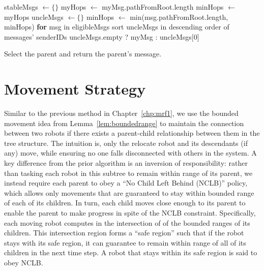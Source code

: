 \begin{algorithm}
{}
  stableMsgs $\leftarrow \{\}$\;
  myHops $\leftarrow$ myMsg.pathFromRoot.length\;
  minHops $\leftarrow$ myHops\;
  uncleMsgs $\leftarrow \{\}$\;
  minHops $\leftarrow$ min(msg.pathFromRoot.length, minHops) \textbf{for} msg in eligibleMsgs\;
  sort uncleMsgs in descending order of messages' senderIDs
  \Return uncleMsgs.empty ? myMsg : uncleMsgs[0]\;
  \caption{Select the parent and return the parent's message.}
  \label{alg:parent}
\end{algorithm}

\begin{figure}
   \centering
   
   \label{fig:spanningtree}
\end{figure}

\section{Movement Strategy}
\label{sec:mov}

Similar to the previous method in Chapter~\ref{chp:mrf1}, we use the bounded movement idea from Lemma~\ref{lem:boundedrange} to maintain
the connection between two robots if there exists a parent-child relationship
between them in the tree structure.  
%
The intuition is, only the relocate robot and its descendants (if any) move, while ensuring no one falls disconnected with others in the system.
%
A key difference from the prior algorithm is an inversion of responsibility:
rather than tasking each robot in this subtree to remain within range of its
parent, we instead require each parent to obey a ``No Child Left Behind
(NCLB)'' policy, which allows only movements that are guaranteed to stay within
bounded range of each of its children.
%
In turn, each child moves close enough to its parent to enable the parent to
make progress in spite of the NCLB constraint.
%
Specifically, each moving robot computes in the intersection of of the bounded
ranges of its children.  
%
This intersection region forms a ``safe region'' such
that if the robot stays with its safe region, it can guarantee to remain within
range of all of its children in the next time step.  
%
A robot that stays within
its safe region is said to obey NCLB.



